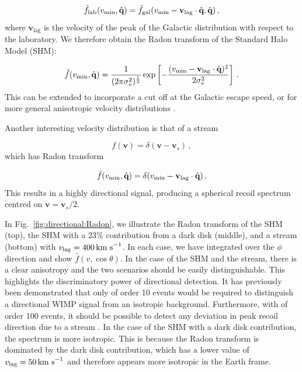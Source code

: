 \begin{equation}
\hat{f}_\textrm{lab}(\vmin, \hat{\textbf{q}}) = \hat{f}_\textrm{gal}(\vmin - \textbf{v}_\textrm{lag}\cdot\hat{\textbf{q}} , \hat{\textbf{q}})\,,
\end{equation}
where $\textbf{v}_\textrm{lag}$ is the velocity of the peak of the Galactic distribution with respect to the laboratory. We therefore obtain the Radon transform of the Standard Halo Model (SHM):

\begin{equation}
\label{eq:directional:SHM}
\hat{f}(\vmin,\hat{\textbf{q}}) =  \frac{1}{(2\pi \sigma_v^2)^{\frac{1}{2}}} \exp \left[ -\frac{(\vmin - \textbf{v}_\textrm{lag}\cdot\hat{\textbf{q}})^2}{2 \sigma_v^2}\right]\,.
\end{equation}
This can be extended to incorporate a cut off at the Galactic escape speed, or for more general anisotropic velocity distributions \cite{Gondolo:2002}.

Another interesting velocity distribution is that of a stream

\begin{equation}
f(\textbf{v}) = \delta(\textbf{v} - \textbf{v}_s)\,,
\end{equation}
which has Radon transform

\begin{equation}
\hat{f}(\vmin,\hat{\textbf{q}}) =  \delta(\vmin - \textbf{v}_\textrm{lag}\cdot\hat{\textbf{q}})\,.
\end{equation}
This results in a highly directional signal, producing a spherical recoil spectrum centred on $\textbf{v} = \textbf{v}_s/2$.


In Fig.~\ref{fig:directional:Radon}, we illustrate the Radon transform of the SHM (top), the SHM with a 23\% contribution from a dark disk (middle), and a stream (bottom) with $v_\textrm{lag} = 400 \,\textrm{km s}^{-1}$. In each case, we have integrated over the $\phi$ direction and show $\hat{f}(v, \cos\theta)$. In the case of the SHM and the stream, there is a clear anisotropy and the two scenarios should be easily distinguishable. This highlights the discriminatory power of directional detection. It has previously been demonstrated that only of order 10 events would be required to distinguish a directional WIMP signal from an isotropic background. Furthermore, with of order 100 events, it should be possible to detect any deviation in peak recoil direction due to a stream \cite{Morgan:2005}. In the case of the SHM with a dark disk contribution, the spectrum is more isotropic. This is because the Radon transform is dominated by the dark disk contribution, which has a lower value of $v_\textrm{lag} = 50 \,\textrm{km s}^{-1}$ and therefore appears more isotropic in the Earth frame. 


